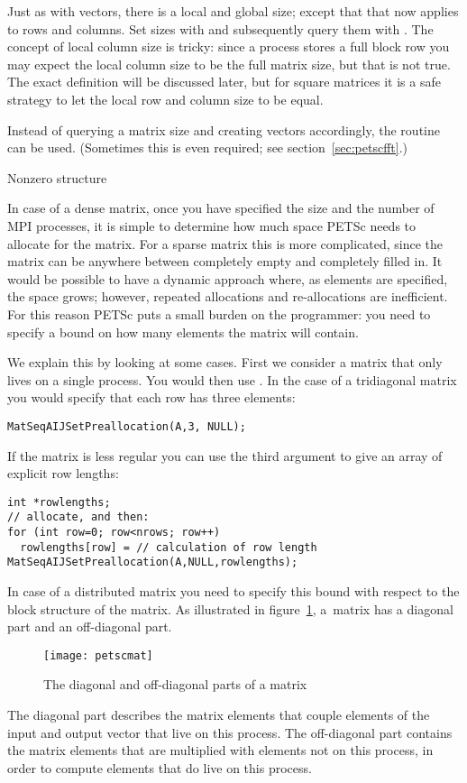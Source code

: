 Just as with vectors, there is a local and global size; except that
that now applies to rows and columns.
Set sizes with
and subsequently query them with
.
The concept of local column size is tricky:
since a process stores a full block row you may expect the local column size
to be the full matrix size, but that is not true.
The exact definition will be discussed later, but for square matrices it is a safe
strategy to let the local row and column size to be equal.

Instead of querying a matrix size and creating vectors accordingly,
the routine  can be used.
(Sometimes this is even required; see section~\ref{sec:petscfft}.)

 {Nonzero structure}

In case of a dense matrix, once you have specified the size and the
number of MPI processes, it is simple to determine how much space PETSc
needs to allocate for the matrix. For a sparse matrix this is more
complicated, since the matrix can be anywhere between completely empty
and completely filled in. It would be possible to have a dynamic
approach where, as elements are specified, the space grows; however,
repeated allocations and re-allocations are inefficient. For this
reason PETSc puts a small burden on the programmer: you need to
specify a bound on how many elements the matrix will contain.

We explain this by looking at some cases. First we consider a matrix
that only lives on a single process. You would then use
.  In
the case of a tridiagonal matrix you would specify that each row has
three elements:
%
\begin{lstlisting}
MatSeqAIJSetPreallocation(A,3, NULL);
\end{lstlisting}

If the matrix is less regular you can use the third argument to give
an array of explicit row lengths:
\begin{lstlisting}
int *rowlengths;
// allocate, and then:
for (int row=0; row<nrows; row++)
  rowlengths[row] = // calculation of row length
MatSeqAIJSetPreallocation(A,NULL,rowlengths);
\end{lstlisting}

In case of a distributed matrix you need to specify this bound with
respect to the block structure of the matrix. As illustrated in figure~\ref{fig:petscmat},
a~matrix has a diagonal part and an off-diagonal part.
%
\begin{figure}[ht]
  \texttt{[image: petscmat]}
  \caption{The diagonal and off-diagonal parts of a matrix}
  \label{fig:petscmat}
\end{figure}
%
The diagonal part describes the matrix elements that couple elements of the
input and output vector that live on this process. The off-diagonal part contains the
matrix elements that are multiplied with elements not on this process, in order to compute
elements that do live on this process.

